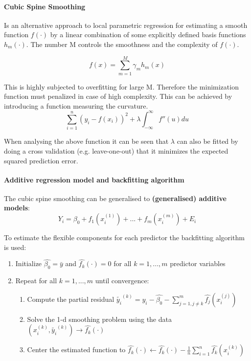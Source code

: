 \paragraph{Cubic Spine Smoothing}
Is an alternative approach to local parametric regression for estimating a smooth function $f(\cdot)$ by a linear combination of some explicitly defined basis functions $h_m(\cdot)$. The number M controls the smoothness and the complexity of $f(\cdot)$.

\begin{equation*}
f(x) = \sum_{m=1}^{M}\gamma_m h_m(x)
\end{equation*}

This is highly subjected to overfitting for large M. Therefore the minimization function must penalized in case of high complexity. This can be achieved by introducing a function measuring the curvature.
\begin{equation*}
\sum_{i=1}^{n}(y_i-f(x_i))^2 + \lambda \int_{-\infty}^{\infty}f''(u) du
\end{equation*}

When analysing the above function it can be seen that $\lambda$ can also be fitted by doing a cross validation (e.g. leave-one-out) that it minimizes the expected squared prediction error.

\paragraph{Additive regression model and backfitting algorithm}
The cubic spine smoothing can be generalised to \textbf{(generalised) additive models}:
\begin{equation*}
Y_i = \beta_0 + f_1(x_i^{(1)}) + ... + f_m(x_i^{(m)}) + E_i
\end{equation*}

To estimate the flexible components for each predictor the backfitting algorithm is used:
\begin{enumerate}
	\tightlist
	\item Initialize $\hat{\beta_0} = \bar{y}$ and $\hat{f_k}(\cdot)=0$ for all $k=1, ..., m$ predictor variables
	\item Repeat for all $k=1, ..., m$ until convergence:
	\begin{enumerate}
		\tightlist
		\item Compute the partial residual $\tilde{y_i}^{(k)} = y_i - \hat{\beta_0}-\sum_{j=1, j\neq k}^{m} \hat{f_j}(x_i^{(j)})$
		\item Solve the 1-d smoothing problem using the data $(x_i^{(k)}, \tilde{y_i}^{(k)}) \rightarrow \hat{f_k}(\cdot)$
		\item Center the estimated function to $\hat{f_k}(\cdot) \leftarrow \hat{f_k}(\cdot) - \frac{1}{n} \sum_{i=1}^{n} \hat{f_k}(x_i^{(k)})$
	\end{enumerate}
\end{enumerate}

